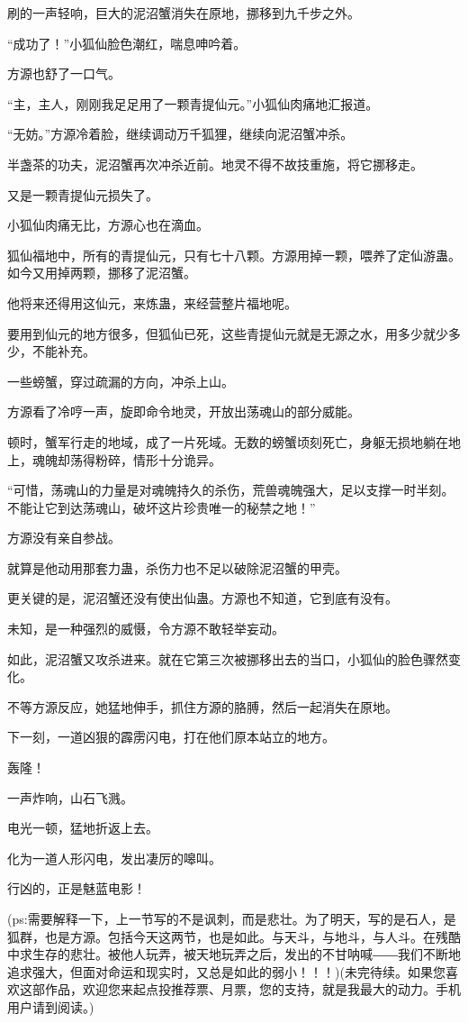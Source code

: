 \begin{this_body}
刷的一声轻响，巨大的泥沼蟹消失在原地，挪移到九千步之外。

“成功了！”小狐仙脸色潮红，喘息呻吟着。

方源也舒了一口气。

“主，主人，刚刚我足足用了一颗青提仙元。”小狐仙肉痛地汇报道。

“无妨。”方源冷着脸，继续调动万千狐狸，继续向泥沼蟹冲杀。

半盏茶的功夫，泥沼蟹再次冲杀近前。地灵不得不故技重施，将它挪移走。

又是一颗青提仙元损失了。

小狐仙肉痛无比，方源心也在滴血。

狐仙福地中，所有的青提仙元，只有七十八颗。方源用掉一颗，喂养了定仙游蛊。如今又用掉两颗，挪移了泥沼蟹。

他将来还得用这仙元，来炼蛊，来经营整片福地呢。

要用到仙元的地方很多，但狐仙已死，这些青提仙元就是无源之水，用多少就少多少，不能补充。

一些螃蟹，穿过疏漏的方向，冲杀上山。

方源看了冷哼一声，旋即命令地灵，开放出荡魂山的部分威能。

顿时，蟹军行走的地域，成了一片死域。无数的螃蟹顷刻死亡，身躯无损地躺在地上，魂魄却荡得粉碎，情形十分诡异。

“可惜，荡魂山的力量是对魂魄持久的杀伤，荒兽魂魄强大，足以支撑一时半刻。不能让它到达荡魂山，破坏这片珍贵唯一的秘禁之地！”

方源没有亲自参战。

就算是他动用那套力蛊，杀伤力也不足以破除泥沼蟹的甲壳。

更关键的是，泥沼蟹还没有使出仙蛊。方源也不知道，它到底有没有。

未知，是一种强烈的威慑，令方源不敢轻举妄动。

如此，泥沼蟹又攻杀进来。就在它第三次被挪移出去的当口，小狐仙的脸色骤然变化。

不等方源反应，她猛地伸手，抓住方源的胳膊，然后一起消失在原地。

下一刻，一道凶狠的霹雳闪电，打在他们原本站立的地方。

轰隆！

一声炸响，山石飞溅。

电光一顿，猛地折返上去。

化为一道人形闪电，发出凄厉的嗥叫。

行凶的，正是魅蓝电影！

(ps:需要解释一下，上一节写的不是讽刺，而是悲壮。为了明天，写的是石人，是狐群，也是方源。包括今天这两节，也是如此。与天斗，与地斗，与人斗。在残酷中求生存的悲壮。被他人玩弄，被天地玩弄之后，发出的不甘呐喊――我们不断地追求强大，但面对命运和现实时，又总是如此的弱小！！！)(未完待续。如果您喜欢这部作品，欢迎您来起点投推荐票、月票，您的支持，就是我最大的动力。手机用户请到阅读。)

\end{this_body}

